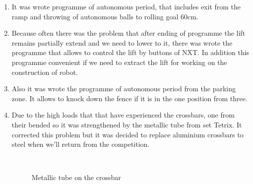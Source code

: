 \begin{enumerate}
	\item It was wrote programme of autonomous period, that includes exit from the ramp and throwing of autonomous balls to rolling goal 60cm.
	
	\item Because often there was the problem that after ending of programme the lift remains partially extend and we need to lower to it, there was wrote the programme that allows to control the lift by buttons of NXT. In addition this programme convenient if we need to extract the lift for working on the construction of robot.
	
	\item Also it was wrote the programme of autonomous period from the parking zone. It allows to knock down the fence if it is in the one position from three.
	
	\item Due to the high loads that that have experienced the crossbars, one from their bended so it was strengthened by the metallic tube from set Tetrix. It corrected this problem but it was decided to replace aluminium crossbars to steel when we'll return from the competition.
	
	\begin{figure}[H]
		\begin{minipage}[h]{0.2\linewidth}
			\center  
		\end{minipage}
		\begin{minipage}[h]{0.6\linewidth}
			\caption{Metallic tube on the crossbar}
		\end{minipage}
	\end{figure}
	

\end{enumerate}
